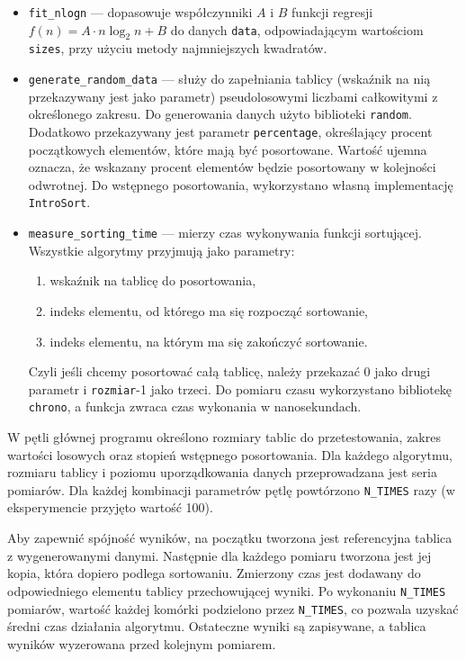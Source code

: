 \documentclass[polish,a4paper]{article}
\begin{document}
\begin{itemize} 
    \item \texttt{fit\_nlogn} — dopasowuje współczynniki $A$ i $B$ funkcji regresji $f(n) = A \cdot n \log_2 n + B$ do danych \texttt{data}, odpowiadającym wartościom \texttt{sizes}, przy użyciu metody najmniejszych kwadratów.
    \item \texttt{generate\_random\_data} — służy do zapełniania tablicy (wskaźnik na nią przekazywany jest jako parametr) pseudolosowymi liczbami całkowitymi z określonego zakresu. Do generowania danych użyto biblioteki \texttt{random}. Dodatkowo przekazywany jest parametr \texttt{percentage}, określający procent początkowych elementów, które mają być posortowane. Wartość ujemna oznacza, że wskazany procent elementów będzie posortowany w kolejności odwrotnej. Do wstępnego posortowania, wykorzystano własną implementację \texttt{IntroSort}.
    \item \texttt{measure\_sorting\_time} — mierzy czas wykonywania funkcji sortującej. Wszystkie algorytmy przyjmują jako parametry:
        \begin{enumerate}
            \item wskaźnik na tablicę do posortowania,
            \item indeks elementu, od którego ma się rozpocząć sortowanie,
            \item indeks elementu, na którym ma się zakończyć sortowanie.
        \end{enumerate} 
        Czyli jeśli chcemy posortować całą tablicę, należy przekazać 0 jako drugi parametr i \texttt{rozmiar}-1 jako trzeci. Do pomiaru czasu wykorzystano bibliotekę \texttt{chrono}, a funkcja zwraca czas wykonania w nanosekundach.
\end{itemize}

W pętli głównej programu określono rozmiary tablic do przetestowania, zakres wartości losowych oraz stopień wstępnego posortowania. Dla każdego algorytmu, rozmiaru tablicy i poziomu uporządkowania danych przeprowadzana jest seria pomiarów. Dla każdej kombinacji parametrów pętlę powtórzono \texttt{N\_TIMES} razy (w eksperymencie przyjęto wartość 100).

Aby zapewnić spójność wyników, na początku tworzona jest referencyjna tablica z wygenerowanymi danymi. Następnie dla każdego pomiaru tworzona jest jej kopia, która dopiero podlega sortowaniu. Zmierzony czas jest dodawany do odpowiedniego elementu tablicy przechowującej wyniki. Po wykonaniu \texttt{N\_TIMES} pomiarów, wartość każdej komórki podzielono przez \texttt{N\_TIMES}, co pozwala uzyskać średni czas działania algorytmu. Ostateczne wyniki są zapisywane, a tablica wyników wyzerowana przed kolejnym pomiarem.
\end{document}
